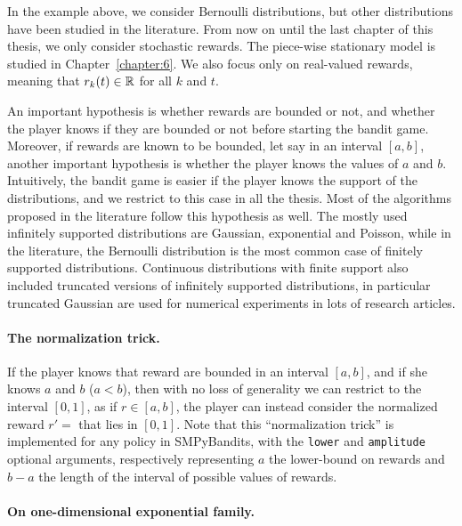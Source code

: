 In the example above, we consider Bernoulli distributions, but other distributions have been studied in the literature.
From now on until the last chapter of this thesis, we only consider stochastic rewards. The piece-wise stationary model is studied in Chapter~\ref{chapter:6}.
%
We also focus only on real-valued rewards, meaning that $r_k(t)\in\mathbb{R}$ for all $k$ and $t$.

An important hypothesis is whether rewards are bounded or not,
and whether the player knows if they are bounded or not before starting the bandit game.
Moreover, if rewards are known to be bounded, let say in an interval $[a,b]$, another important hypothesis is whether the player knows the values of $a$ and $b$.
%
Intuitively, the bandit game is easier if the player knows the support of the distributions, and we restrict to this case in all the thesis.
Most of the algorithms proposed in the literature follow this hypothesis as well.
%
The mostly used
infinitely supported distributions are Gaussian, exponential and Poisson,
while in the literature, the Bernoulli distribution is the most common case of finitely supported distributions.
Continuous distributions with finite support also included truncated versions of infinitely supported distributions, in particular truncated Gaussian are used for numerical experiments in lots of research articles.

\paragraph{The normalization trick.}\label{par:2:normalizationTrick}
%
If the player knows that reward are bounded in an interval $[a,b]$, and if she knows $a$ and $b$ ($a<b$), then with no loss of generality we can restrict to the interval $[0,1]$, as if $r\in[a,b]$, the player can instead consider the normalized reward $r' = $ that lies in $[0,1]$.
Note that this ``normalization trick'' is implemented for any policy in SMPyBandits, with the \texttt{lower} and \texttt{amplitude} optional arguments, respectively representing $a$ the lower-bound on rewards and $b-a$ the length of the interval of possible values of rewards.


\paragraph{On one-dimensional exponential family.}
%

